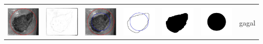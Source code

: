\begin{table}[H]
\begin{tabular}{|m{0.7in}|m{0.7in}|m{0.7in}|m{0.7in}|m{0.7in}|m{0.7in}|m{0.7in}|}
		&  &  & & & &  \\
		\includegraphics[width=0.7in]{dataset/dataset_3/luka_merah/ready/20_integer_init.jpg}&
		\includegraphics[width=0.7in]{dataset/dataset_3/luka_merah/ready/20_integer_ext.jpg}&
		\includegraphics[width=0.7in]{dataset/dataset_3/luka_merah/ready/20_integer_result.jpg}&
		\includegraphics[width=0.7in]{dataset/dataset_3/luka_merah/ready/20_gt_r_integer.jpg}&
		\includegraphics[width=0.7in]{dataset/dataset_3/luka_merah/ready/20_r.jpg}&
		\includegraphics[width=0.7in]{dataset/dataset_3/luka_merah/ready/20_integer_r.jpg}&
		gagal\\
		\hline
		

\end{tabular}
\end{table}
